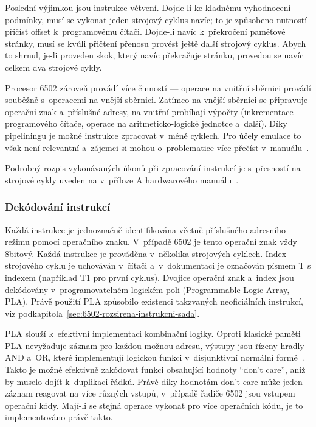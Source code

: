 Poslední výjimkou jsou instrukce větvení. Dojde-li ke kladnému vyhodnocení podmínky, musí se vykonat jeden strojový cyklus navíc; to je způsobeno nutností přičíst offset k~programovému čítači. Dojde-li navíc k~překročení paměťové stránky, musí se kvůli přičtení přenosu provést ještě další strojový cyklus. Abych to shrnul, je-li proveden skok, který navíc překračuje stránku, provedou se navíc celkem dva strojové cykly.

\begin{note}[6502 a pipelining]
	Procesor 6502 zároveň provádí více činností --- operace na vnitřní sběrnici provádí souběžně s~operacemi na vnější sběrnici. Zatímco na vnější sběrnici se připravuje operační znak a~příslušné adresy, na vnitřní probíhají výpočty (inkrementace programového čítače, operace na aritmeticko-logické jednotce a~další). Díky pipeliningu je možné instrukce zpracovat v~méně cyklech. Pro účely emulace to však není relevantní a~zájemci si mohou o~problematice více přečíst v~manuálu~\cite{mos:sw-manual}.
\end{note}

Podrobný rozpis vykonávaných úkonů při zpracování instrukcí je s~přesností na strojové cykly uveden na v~příloze A hardwarového manuálu~\cite{mos:hw-manual}.

\subsubsection{Dekódování instrukcí}
\label{sec:6502-dekodovani-instrukci}
Každá instrukce je jednoznačně identifikována včetně příslušného adresního režimu pomocí operačního znaku. V~případě 6502 je tento operační znak vždy 8bitový.  Každá instrukce je prováděna v~několika strojových cyklech.  Index strojového cyklu je uchováván v~čítači a~v~dokumentaci je označován písmem T s indexem (například T1 pro první cyklus). Dvojice operační znak a~index jsou dekódovány v~programovatelném logickém poli (Programmable Logic Array, PLA).  Právě použití PLA způsobilo existenci takzvaných neoficiálních instrukcí, viz podkapitola~\ref{sec:6502-rozsirena-instrukcni-sada}.

PLA slouží k~efektivní implementaci kombinační logiky.  Oproti klasické paměti PLA nevyžaduje záznam pro každou možnou adresu, výstupy jsou řízeny hradly AND a~OR, které implementují logickou funkci v~disjunktivní normální formě~\cite{Wikipedia:PLA}. Takto je možné efektivně zakódovat funkci obsahující hodnoty \enquote{don't care}, aniž by muselo dojít k~duplikaci řádků. Právě díky hodnotám don't care může jeden záznam reagovat na více různých vstupů, v~případě řadiče 6502 jsou vstupem operační kódy. Mají-li se stejná operace vykonat pro více operačních kódu, je to implementováno právě takto.

